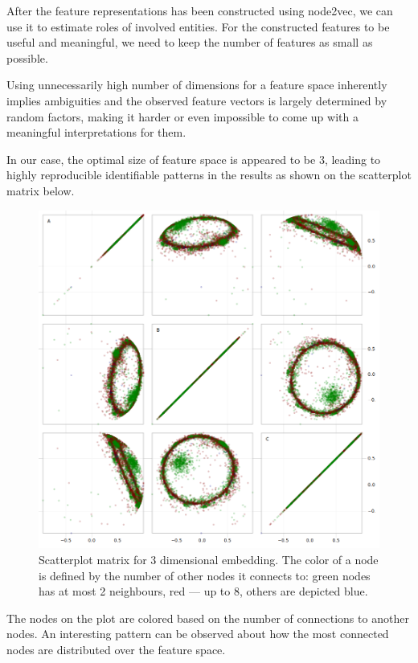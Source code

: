After the feature representations has been constructed using node2vec, we can use it to estimate roles of involved entities. For the constructed features to be useful and meaningful, we need to keep the number of features as small as possible.

Using unnecessarily high number of dimensions for a feature space inherently implies ambiguities and the observed feature vectors is largely determined by random factors, making it harder or even impossible to come up with a meaningful interpretations for them.

In our case, the optimal size of feature space is appeared to be 3, leading to highly reproducible identifiable patterns in the results as shown on the scatterplot matrix below.

\begin{figure}[H]   \centering
    \includegraphics[width=0.7\linewidth]{plots/ScatterplotMatrix1.png}
    \caption{Scatterplot matrix for 3 dimensional embedding. The color of a node is defined by the number of other nodes it connects to: green nodes has at most 2 neighbours, red --- up to 8, others are depicted blue.}
    \label{fig:my_label}
\end{figure}

The nodes on the plot are colored based on the number of connections to another nodes. An interesting pattern can be observed about how the most connected nodes are distributed over the feature space.

